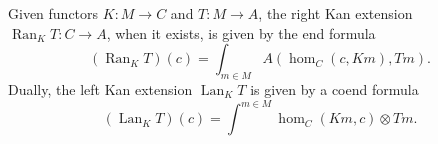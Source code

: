 Given functors $K: M \rightarrow C$ and $T: M \rightarrow A$, the right Kan extension $\operatorname{Ran}_K T: C \rightarrow A$, when it exists, is given by the end formula
\[
(\operatorname{Ran}_K T)(c) = \int_{m \in M} A(\hom_C(c, Km), Tm).
\]
Dually, the left Kan extension $\operatorname{Lan}_K T$ is given by a coend formula
\[
(\operatorname{Lan}_K T)(c) = \int^{m \in M} \hom_C(Km, c) \otimes Tm.
\]